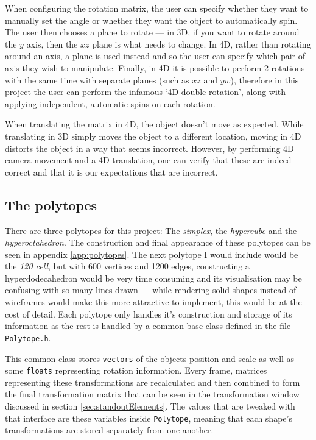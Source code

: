 \documentclass[11pt, a4paper]{article}
\begin{document}
When configuring the rotation matrix, the user can specify whether they want to manually set the angle or whether they want the object to automatically spin. The user then chooses a plane to rotate --- in 3D, if you want to rotate around the $y$ axis, then the $xz$ plane is what needs to change. In 4D, rather than rotating around an axis, a plane is used instead and so the user can specify which pair of axis they wish to manipulate. Finally, in 4D it is possible to perform 2 rotations with the same time with separate planes (such as $xz$ and $yw$), therefore in this project the user can perform the infamous `4D double rotation', along with applying independent, automatic spins on each rotation.

When translating the matrix in 4D, the object doesn't move as expected. While translating in 3D simply moves the object to a different location, moving in 4D distorts the object in a way that seems incorrect. However, by performing 4D camera movement and a 4D translation, one can verify that these are indeed correct and that it is our expectations that are incorrect.

\subsection{The polytopes}
\label{subsec:polytopes}

There are three polytopes for this project: The \emph{simplex}, the \emph{hypercube} and the \emph{hyperoctahedron}. The construction and final appearance of these polytopes can be seen in appendix \ref{app:polytopes}. The next polytope I would include would be the \emph{120 cell}, but with 600 vertices and 1200 edges, constructing a hyperdodecahedron would be very time consuming and its visualisation may be confusing with so many lines drawn --- while rendering solid shapes instead of wireframes would make this more attractive to implement, this would be at the cost of detail. Each polytope only handles it's construction and storage of its information as the rest is handled by a common base class defined in the file \texttt{Polytope.h}.

This common class stores \texttt{vectors} of the objects position and scale as well as some \texttt{floats} representing rotation information. Every frame, matrices representing these transformations are recalculated and then combined to form the final transformation matrix that can be seen in the transformation window discussed in section \ref{sec:standoutElements}. The values that are tweaked with that interface are these variables inside \texttt{Polytope}, meaning that each shape's transformations are stored separately from one another.
\end{document}
